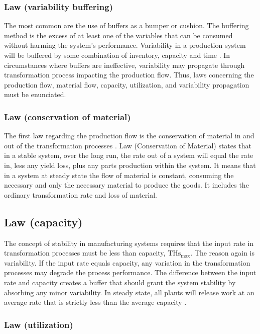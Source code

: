 \documentclass{article}
\begin{document}
\subsubsection{Law (variability buffering)}
\label{sec:orgd325ed5}

The most common are the use of buffers as a bumper or cushion.
The buffering method is the excess of at least one of the variables that can be consumed without harming the system's performance.
Variability in a production system will be buffered by some combination of inventory, capacity and time \citep[p.295]{Hopp2001}.
In circumstances where buffers are ineffective, variability may propagate through transformation process impacting the production flow.
Thus, laws concerning the production flow, material flow, capacity, utilization, and variability propagation must be enunciated.

\subsubsection{Law (conservation of material)}
\label{sec:orgc8db730}

The first law regarding the production flow is the conservation of material in and out of the transformation processes \citep{Hopp2001}.
Law (Conservation of Material) states that in a stable system, over the long run, the rate out of a system will equal the rate in, less any yield loss, plus any parts production within the system.
It means that in a system at steady state the flow of material is constant, consuming the necessary and only the necessary material to produce the goods.
It includes the ordinary transformation rate and loss of material.

\subsection{Law (capacity)}
The concept of stability in manufacturing systems requires that the input rate in transformation processes must be less than capacity, \(\mbox{THs}_{\mbox{max}}\).
The reason again is variability.
If the input rate equals capacity, any variation in the transformation processes may degrade the process performance.
The difference between the input rate and capacity creates a buffer that should grant the system stability by absorbing any minor variability.
In steady state, all plants will release work at an average rate that is strictly less than the average capacity \citep[p.303]{Hopp2001}.

\subsubsection{Law (utilization)}
\label{sec:org2dc8e52}
\end{document}
